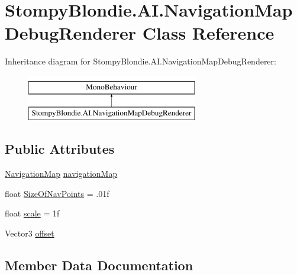 \hypertarget{class_stompy_blondie_1_1_a_i_1_1_navigation_map_debug_renderer}{}\section{Stompy\+Blondie.\+A\+I.\+Navigation\+Map\+Debug\+Renderer Class Reference}
\label{class_stompy_blondie_1_1_a_i_1_1_navigation_map_debug_renderer}
Inheritance diagram for Stompy\+Blondie.\+A\+I.\+Navigation\+Map\+Debug\+Renderer\+:\begin{figure}[H]
\begin{center}
\leavevmode
\includegraphics[height=2.000000cm]{class_stompy_blondie_1_1_a_i_1_1_navigation_map_debug_renderer}
\end{center}
\end{figure}
\subsection*{Public Attributes}
\begin{DoxyCompactItemize}
\item 
\mbox{\hyperlink{class_stompy_blondie_1_1_a_i_1_1_navigation_map}{Navigation\+Map}} \mbox{\hyperlink{class_stompy_blondie_1_1_a_i_1_1_navigation_map_debug_renderer_a0a77ce86000ac6b86e4c703876811f16}{navigation\+Map}}
\item 
float \mbox{\hyperlink{class_stompy_blondie_1_1_a_i_1_1_navigation_map_debug_renderer_acd8a0a421c1a96bfb97b60096393f272}{Size\+Of\+Nav\+Points}} = .\+01f
\item 
float \mbox{\hyperlink{class_stompy_blondie_1_1_a_i_1_1_navigation_map_debug_renderer_a7ed34eb6c899be86811aa39b64152242}{scale}} = 1f
\item 
Vector3 \mbox{\hyperlink{class_stompy_blondie_1_1_a_i_1_1_navigation_map_debug_renderer_aaf4d2f24bdea73fbb609397acfacbd92}{offset}}
\end{DoxyCompactItemize}


\subsection{Member Data Documentation}
\mbox{\label{class_stompy_blondie_1_1_a_i_1_1_navigation_map_debug_renderer_a0a77ce86000ac6b86e4c703876811f16}} 
